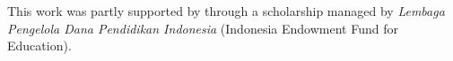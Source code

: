 \documentclass{jot}
\begin{document}
    \backmatter
    
    
    
    
    \vspace{-11pt}
    
    
    
    \begin{acknowledgments}
        This work was partly supported by through a scholarship managed by \emph{Lembaga Pengelola Dana Pendidikan Indonesia} (Indonesia Endowment Fund for Education).
    \end{acknowledgments}
    
\end{document}

